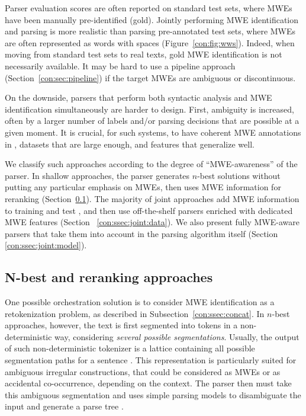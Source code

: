 \documentclass[output=paper]{langsci/langscibook}
\begin{document}
Parser evaluation scores are often reported on standard test sets, where MWEs have been manually pre-identified (gold).
Jointly performing MWE identification and parsing is more realistic than parsing pre-annotated test sets, where MWEs are often represented as words with spaces (Figure~\ref{con:fig:wws}).
Indeed, when moving from standard test sets to real texts, gold MWE identification is not necessarily available.
It may be hard to use a pipeline approach (Section~\ref{con:sec:pipeline}) if the target MWEs are ambiguous or discontinuous.

On the downside, parsers that perform both syntactic analysis and MWE identification simultaneously are harder to design.
First, ambiguity is increased, often by a larger number of labels and/or parsing decisions that are possible at a given moment.
It is crucial, for such systems, to have coherent MWE annotations in , datasets that are large enough, and features that generalize well. 

We classify such approaches according to the degree of  ``MWE-awareness'' of the parser.
In shallow approaches, the parser generates $n$-best solutions without putting any particular emphasis on MWEs, then uses MWE information for reranking (Section~\ref{con:ssec:joint:rerank}).
The majority of joint approaches add MWE information to training and test , and then use off-the-shelf parsers enriched with dedicated MWE features (Section~ \ref{con:ssec:joint:data}). 
We also present fully MWE-aware parsers that take them into account in the parsing algorithm itself (Section~ \ref{con:ssec:joint:model}).


\subsection{N-best and reranking approaches }
\label{con:ssec:joint:rerank}

One possible orchestration solution is to consider MWE identification as a retokenization problem, as described in Subsection~\ref{con:ssec:concat}.
In $n$-best approaches, however, the text is first segmented into tokens in a non-deterministic way, considering \emph{several possible segmentations}.
Usually, the output of such non-deterministic tokenizer is a lattice containing all possible segmentation paths for a sentence \citep{sagot:2005}.
This representation is particularly suited for ambiguous irregular constructions, that could be considered as MWEs or as accidental co-occurrence, depending on the context.
The parser then must take this ambiguous segmentation and uses simple parsing models to disambiguate the input and generate a parse tree \citep{nasr:11}.
\end{document}
